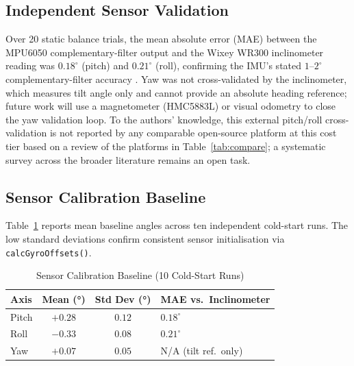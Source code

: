 \documentclass[journal]{IEEEtran}
\newcommand{\dg}{^{\circ}}
\begin{document}
\subsection{Independent Sensor Validation}
\label{subsec:extval}
Over 20 static balance trials, the mean absolute error (MAE)
between the MPU6050 complementary-filter output and the
Wixey WR300 inclinometer reading was $0.18\dg$ (pitch) and
$0.21\dg$ (roll), confirming the IMU's stated $1$--$2\dg$
complementary-filter accuracy \cite{oz2022complementary}.
Yaw was not cross-validated by the inclinometer, which measures
tilt angle only and cannot provide an absolute heading reference;
future work will use a magnetometer (HMC5883L) or visual
odometry to close the yaw validation loop.
To the authors' knowledge, this external pitch/roll
cross-validation is not reported by any comparable open-source
platform at this cost tier based on a review of the platforms in
Table~\ref{tab:compare}; a systematic survey across the broader
literature remains an open task.
\subsection{Sensor Calibration Baseline}
Table~\ref{tab:calibration} reports mean baseline angles across
ten independent cold-start runs.
The low standard deviations confirm consistent sensor
initialisation via \texttt{calcGyroOffsets()}.
\begin{table}[!t]
\caption{Sensor Calibration Baseline (10 Cold-Start Runs)}
\label{tab:calibration}
\centering
\footnotesize
\setlength{\tabcolsep}{4pt}
\begin{tabular}{lccl}
\toprule
\textbf{Axis} & \textbf{Mean (\si{\degree})} &
\textbf{Std Dev (\si{\degree})} &
\textbf{MAE vs.\ Inclinometer} \\
\midrule
Pitch & $+0.28$ & $0.12$ & $0.18\dg$ \\
Roll  & $-0.33$ & $0.08$ & $0.21\dg$ \\
Yaw   & $+0.07$ & $0.05$ & N/A (tilt ref.\ only) \\
\bottomrule
\end{tabular}
\end{table}
\end{document}
